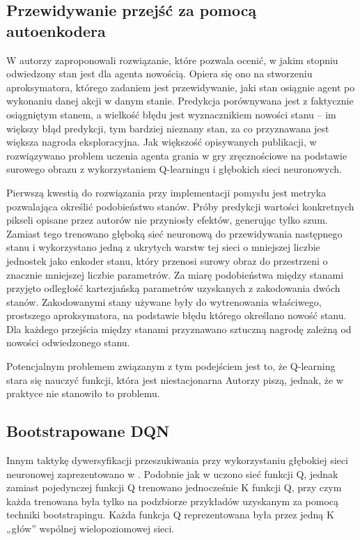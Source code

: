 \subsection{Przewidywanie przejść za pomocą autoenkodera}
W \cite{DBLP:journals/corr/StadieLA15} autorzy zaproponowali rozwiązanie, które pozwala ocenić, w jakim stopniu odwiedzony stan jest dla agenta nowością. Opiera się ono na stworzeniu aproksymatora, którego zadaniem jest przewidywanie, jaki stan osiągnie agent po wykonaniu danej akcji w danym stanie. Predykcja porównywana jest z faktycznie osiągniętym stanem, a wielkość błędu jest wyznacznikiem nowości stanu – im większy błąd predykcji, tym bardziej nieznany stan, za co przyznawana jest większa nagroda eksploracyjna. Jak większość opisywanych publikacji, w \cite{DBLP:journals/corr/StadieLA15} rozwiązywano problem uczenia agenta grania w gry zręcznościowe na podstawie surowego obrazu z wykorzystaniem Q-learningu i głębokich sieci neuronowych.

Pierwszą kwestią do rozwiązania przy implementacji pomysłu jest metryka pozwalająca określić podobieństwo stanów. Próby predykcji wartości konkretnych pikseli opisane przez autorów nie przyniosły efektów, generując tylko szum. Zamiast tego trenowano głęboką sieć neuronową do przewidywania następnego stanu i wykorzystano jedną z ukrytych warstw tej sieci o mniejszej liczbie jednostek jako enkoder stanu, który przenosi surowy obraz do przestrzeni o znacznie mniejszej liczbie parametrów. Za miarę podobieństwa między stanami przyjęto odległość kartezjańską parametrów uzyskanych z zakodowania dwóch stanów. Zakodowanymi stany używane były do wytrenowania właściwego, prostszego aproksymatora, na podstawie błędu którego określano nowość stanu. Dla każdego przejścia między stanami przyznawano sztuczną nagrodę zależną od nowości odwiedzonego stanu.

Potencjalnym problemem związanym z tym podejściem jest to, że Q-learning stara się nauczyć funkcji, która jest niestacjonarna Autorzy piszą, jednak, że w praktyce nie stanowiło to problemu.

\subsection{Bootstrapowane DQN}
Innym taktykę dywersyfikacji przeszukiwania przy wykorzystaniu głębokiej sieci neuronowej zaprezentowano w \cite{DBLP:journals/corr/OsbandBPR16}. Podobnie jak w \cite{DBLP:journals/corr/StadieLA15} uczono sieć funkcji Q, jednak zamiast pojedynczej funkcji Q trenowano jednocześnie K funkcji Q, przy czym każda trenowana była tylko na podzbiorze przykładów uzyskanym za pomocą techniki bootstrapingu. Każda funkcja Q reprezentowana była przez jedną K „głów” wspólnej wielopoziomowej sieci.

